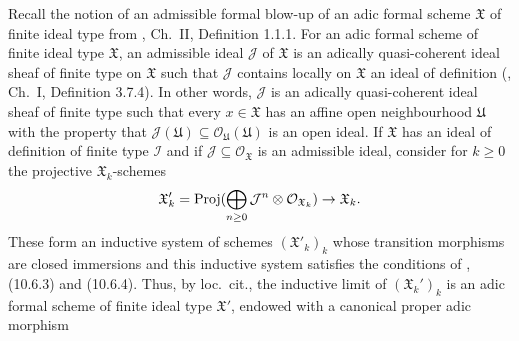 \documentclass[12pt,twoside,a4paper]{article}
\theoremstyle{definition}
\theoremstyle{remark}
\newcommand\Proj{{\rm Proj}}
\begin{document}
Recall the notion of an admissible formal blow-up of an adic formal scheme $\mathfrak{X}$ of finite ideal type from \cite{FK}, Ch.~II, Definition 1.1.1. For an adic formal scheme of finite ideal type $\mathfrak{X}$, an admissible ideal $\mathcal{J}$ of $\mathfrak{X}$ is an adically quasi-coherent ideal sheaf of finite type on $\mathfrak{X}$ such that $\mathcal{J}$ contains locally on $\mathfrak{X}$ an ideal of definition (\cite{FK}, Ch.~I, Definition 3.7.4). In other words, $\mathcal{J}$ is an adically quasi-coherent ideal sheaf of finite type such that every $x\in \mathfrak{X}$ has an affine open neighbourhood $\mathfrak{U}$ with the property that $\mathcal{J}(\mathfrak{U})\subseteq \mathcal{O}_{\mathfrak{U}}(\mathfrak{U})$ is an open ideal. If $\mathfrak{X}$ has an ideal of definition of finite type $\mathcal{I}$ and if $\mathcal{J}\subseteq \mathcal{O}_{\mathfrak{X}}$ is an admissible ideal, consider for $k\geq 0$ the projective $\mathfrak{X}_{k}$-schemes\begin{equation*}\mathfrak{X}_{k}'=\Proj(\bigoplus_{n\geq 0}\mathcal{J}^{n}\otimes \mathcal{O}_{\mathfrak{X}_{k}})\to \mathfrak{X}_{k}.\end{equation*}These form an inductive system of schemes $(\mathfrak{X}'_{k})_{k}$ whose transition morphisms are closed immersions and this inductive system satisfies the conditions of \cite{EGAIa}, (10.6.3) and (10.6.4). Thus, by loc.~cit., the inductive limit of $(\mathfrak{X}_{k}')_{k}$ is an adic formal scheme of finite ideal type $\mathfrak{X}'$, endowed with a canonical proper adic morphism \begin{center}\end{center}
\end{document}
